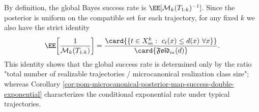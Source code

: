 \begin{remark}\label{rem:pom-microcanonical-global-vs-typical-bayes-success}
By definition, the global Bayes success rate is \(\EE[\mathcal{M}_k(T_{1:k})^{-1}]\).
Since the posterior is uniform on the compatible set for each trajectory,
for any fixed \(k\) we also have the strict identity
\[
\EE\!\left[\frac{1}{\mathcal{M}_k(T_{1:k})}\right]
=\frac{\card{\{t\in X_m^k:\ c_t(x)\le d(x)\ \forall x\}}}{\card{\mathfrak{Fold}_m(d)}}.
\]
This identity shows that the global success rate is determined only by the ratio "total number of realizable trajectories / microcanonical realization class size";
whereas Corollary \ref{cor:pom-microcanonical-posterior-map-success-double-exponential} characterizes the conditional exponential rate under typical trajectories.
\end{remark}

\endinput

